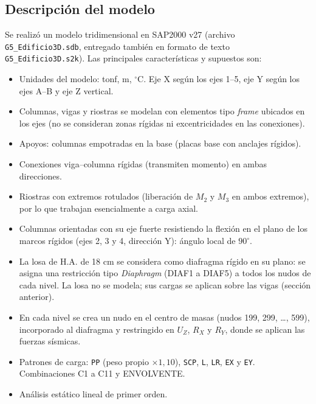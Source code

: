 \documentclass[11pt,letterpaper]{article}
\begin{document}
\subsection{Descripción del modelo}
Se realizó un modelo tridimensional en SAP2000 v27 (archivo \texttt{G5\_Edificio3D.sdb}, entregado también
en formato de texto \texttt{G5\_Edificio3D.s2k}). Las principales características y supuestos son:
\begin{itemize}
  \item Unidades del modelo: tonf, m, $^\circ$C. Eje X según los ejes 1--5, eje Y según los ejes A--B y eje Z vertical.
  \item Columnas, vigas y riostras se modelan con elementos tipo \emph{frame} ubicados en los ejes
        (no se consideran zonas rígidas ni excentricidades en las conexiones).
  \item Apoyos: columnas empotradas en la base (placas base con anclajes rígidos).
  \item Conexiones viga--columna rígidas (transmiten momento) en ambas direcciones.
  \item Riostras con extremos rotulados (liberación de $M_2$ y $M_3$ en ambos extremos), por lo que trabajan
        esencialmente a carga axial.
  \item Columnas orientadas con su eje fuerte resistiendo la flexión en el plano de los marcos rígidos
        (ejes 2, 3 y 4, dirección Y): ángulo local de $90^\circ$.
  \item La losa de H.A. de 18 cm se considera como diafragma rígido en su plano: se asigna una restricción
        tipo \emph{Diaphragm} (DIAF1 a DIAF5) a todos los nudos de cada nivel. La losa no se modela; sus cargas
        se aplican sobre las vigas (sección anterior).
  \item En cada nivel se crea un nudo en el centro de masas (nudos 199, 299, \dots, 599), incorporado al diafragma
        y restringido en $U_Z$, $R_X$ y $R_Y$, donde se aplican las fuerzas sísmicas.
  \item Patrones de carga: \texttt{PP} (peso propio $\times 1{,}10$), \texttt{SCP}, \texttt{L}, \texttt{LR},
        \texttt{EX} y \texttt{EY}. Combinaciones C1 a C11 y ENVOLVENTE.
  \item Análisis estático lineal de primer orden.
\end{itemize}
\end{document}
